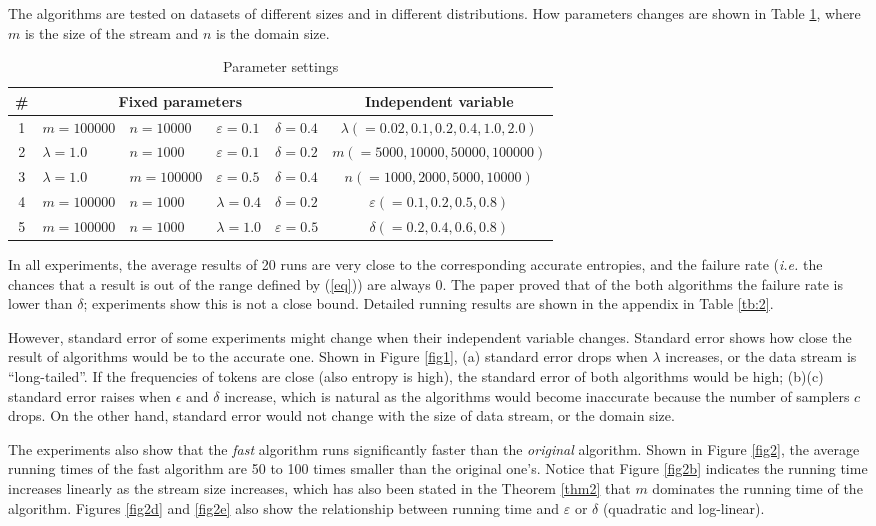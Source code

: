 \documentclass{scrartcl}
\begin{document}
The algorithms are tested on datasets of different sizes and in different distributions. How parameters changes are shown in Table \ref{tb:1}, where $m$ is the size of the stream and $n$ is the domain size.

\begin{table}[htbp]
\centering
\begin{tabularx}{0.95\textwidth}{c|llll|c}
\toprule
\# &\multicolumn{4}{c}{Fixed parameters} & Independent variable \\
\midrule
1&$m=100000$ & $n=10000$ & $\varepsilon=0.1$ & $\delta=0.4$ & $\lambda(=0.02,0.1,0.2,0.4,1.0,2.0)$\\
2&$\lambda=1.0$ & $n=1000$ & $\varepsilon=0.1$ & $\delta=0.2$ & $m(=5000,10000,50000,100000)$\\
3&$\lambda=1.0$ & $m=100000$ & $\varepsilon=0.5$ & $\delta=0.4$ & $n(=1000,2000,5000,10000)$\\
4&$m=100000$ & $n=1000$ & $\lambda=0.4$ & $\delta=0.2$ & $\varepsilon(=0.1,0.2,0.5,0.8)$\\
5&$m=100000$ & $n=1000$ & $\lambda=1.0$ & $\varepsilon=0.5$ & $\delta(=0.2,0.4,0.6,0.8)$\\
\bottomrule
\end{tabularx}
\caption{Parameter settings}
\label{tb:1}
\end{table}

In all experiments, the average results of 20 runs are very close to the corresponding accurate entropies, and the failure rate (\emph{i.e.} the chances that a result is out of the range defined by (\ref{eq})) are always 0. The paper proved that of the both algorithms the failure rate is lower than $\delta$; experiments show this is not a close bound. Detailed running results are shown in the appendix in Table \ref{tb:2}.

However, standard error of some experiments might change when their independent variable changes. Standard error shows how close the result of algorithms would be to the accurate one. Shown in Figure \ref{fig1}, (a) standard error drops when $\lambda$ increases, or the data stream is ``long-tailed''. If the frequencies of tokens are close (also entropy is high), the standard error of both algorithms would be high; (b)(c) standard error raises when $\epsilon$ and $\delta$ increase, which is natural as the algorithms would become inaccurate because the number of samplers $c$drops. On the other hand, standard error would not change with the size of data stream, or the domain size.

The experiments also show that the \emph{fast} algorithm runs significantly faster than the \emph{original} algorithm. Shown in Figure \ref{fig2}, the average running times of the fast algorithm are 50 to 100 times smaller than the original one's. Notice that Figure \ref{fig2b} indicates the running time increases linearly as the stream size increases, which has also been stated in the Theorem \ref{thm2} that $m$ dominates the running time of the algorithm. Figures \ref{fig2d} and \ref{fig2e} also show the relationship between running time and $\varepsilon$ or $\delta$ (quadratic and log-linear).
\end{document}
